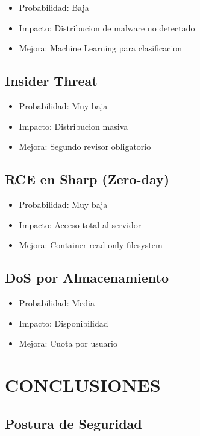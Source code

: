 \documentclass[12pt,a4paper]{article}
\begin{document}
\begin{itemize}
    \item Probabilidad: Baja
    \item Impacto: Distribucion de malware no detectado
    \item Mejora: Machine Learning para clasificacion
\end{itemize}

\subsection{Insider Threat}

\begin{itemize}
    \item Probabilidad: Muy baja
    \item Impacto: Distribucion masiva
    \item Mejora: Segundo revisor obligatorio
\end{itemize}

\subsection{RCE en Sharp (Zero-day)}

\begin{itemize}
    \item Probabilidad: Muy baja
    \item Impacto: Acceso total al servidor
    \item Mejora: Container read-only filesystem
\end{itemize}

\subsection{DoS por Almacenamiento}

\begin{itemize}
    \item Probabilidad: Media
    \item Impacto: Disponibilidad
    \item Mejora: Cuota por usuario
\end{itemize}

\section{CONCLUSIONES}

\subsection{Postura de Seguridad}
\end{document}
